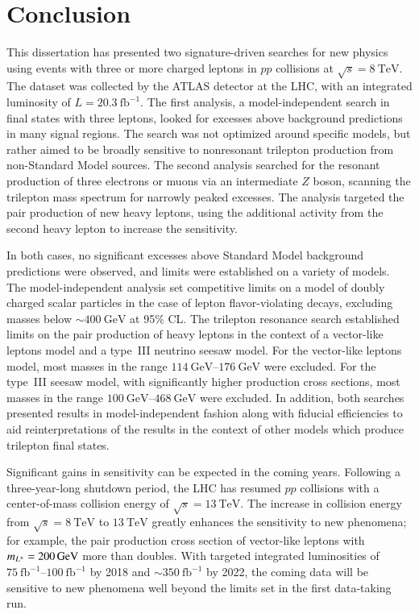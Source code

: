 \chapter{Conclusion}
This dissertation has presented two signature-driven searches for new physics using events with three or more charged leptons in $pp$ collisions at $\sqrt{s}=\SI{8}{\tera\electronvolt}$. The dataset was collected by the ATLAS detector at the LHC, with an integrated luminosity of $L=\SI{20.3}{\femto\barn\tothe{-1}}$. The first analysis, a model-independent search in final states with three leptons, looked for excesses above background predictions in many signal regions. The search was not optimized around specific models, but rather aimed to be broadly sensitive to nonresonant trilepton production from non-Standard Model sources. The second analysis searched for the resonant production of three electrons or muons via an intermediate $Z$ boson, scanning the trilepton mass spectrum for narrowly peaked excesses. The analysis targeted the pair production of new heavy leptons, using the additional activity from the second heavy lepton to increase the sensitivity. 

In both cases, no significant excesses above Standard Model background predictions were observed, and limits were established on a variety of models. The model-independent analysis set competitive limits on a model of doubly charged scalar particles in the case of lepton flavor-violating decays, excluding masses below $\sim\SI{400}{\giga\electronvolt}$ at 95\% CL. The trilepton resonance search established limits on the pair production of heavy leptons in the context of a vector-like leptons model and a type~III neutrino seesaw model. For the vector-like leptons model, most masses in the range $\SIrange[range-phrase=-]{114}{176}{\giga\electronvolt}$ were excluded. For the type~III seesaw model, with significantly higher production cross sections, most masses in the range $\SIrange[range-phrase=-]{100}{468}{\giga\electronvolt}$ were excluded. In addition, both searches presented results in model-independent fashion along with fiducial efficiencies to aid reinterpretations of the results in the context of other models which produce trilepton final states. 

Significant gains in sensitivity can be expected in the coming years. Following a three-year-long shutdown period, the LHC has resumed $pp$ collisions with a center-of-mass collision energy of $\sqrt{s}=\SI{13}{\tera\electronvolt}$. The increase in collision energy from $\sqrt{s}=\SI{8}{\tera\electronvolt}$ to $\SI{13}{\tera\electronvolt}$ greatly enhances the sensitivity to new phenomena; for example, the pair production cross section of vector-like leptons with $m_{L^{\pm}}=\SI{200}{\giga\electronvolt}$ more than doubles. With targeted integrated luminosities of $\SIrange[range-phrase=-]{75}{100}{\femto\barn\tothe{-1}}$ by 2018 and $\sim\SI{350}{\femto\barn\tothe{-1}}$ by 2022, the coming data will be sensitive to new phenomena well beyond the limits set in the first data-taking run.
